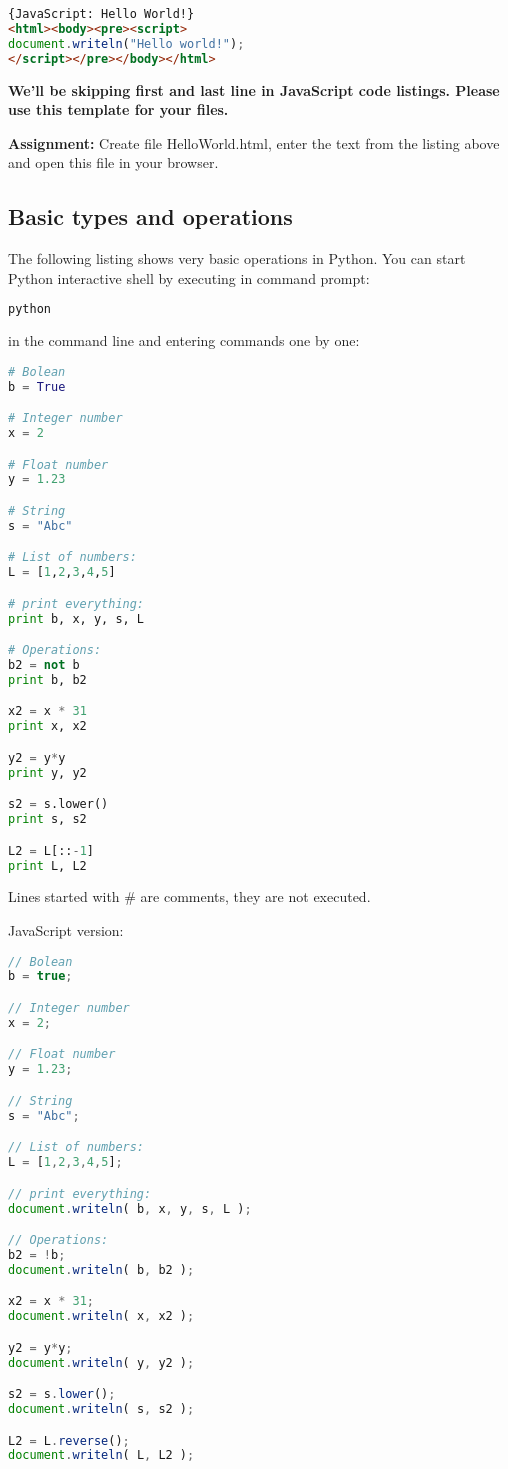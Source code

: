 \begin{lstlisting}[style=codelst,language=HTML]{JavaScript: Hello World!}
<html><body><pre><script>
document.writeln("Hello world!");
</script></pre></body></html>
\end{lstlisting}
\textbf{We'll be skipping first and last line in JavaScript
code listings. Please use this template for your files.}

\bigskip
\begin{tcolorbox}
\textbf{Assignment:} Create file HelloWorld.html, enter the text from the
listing above and open this file in your browser.
\end{tcolorbox}

\subsection{Basic types and operations}

The following listing shows very basic operations
in Python. You can start Python interactive shell by executing
in command prompt:
\begin{lstlisting}[language=bash,style=codelst]
python
\end{lstlisting}
in the command line and entering commands one by one:

\begin{lstlisting}[style=codelst,language=Python]
# Bolean
b = True

# Integer number
x = 2

# Float number
y = 1.23

# String
s = "Abc"

# List of numbers:
L = [1,2,3,4,5]

# print everything:
print b, x, y, s, L

# Operations:
b2 = not b
print b, b2

x2 = x * 31
print x, x2

y2 = y*y
print y, y2

s2 = s.lower()
print s, s2

L2 = L[::-1]
print L, L2
\end{lstlisting}
Lines started with \# are comments, they are not executed.

JavaScript version:
\begin{lstlisting}[style=codelst,language=JavaScript]
// Bolean
b = true;

// Integer number
x = 2;

// Float number
y = 1.23;

// String
s = "Abc";

// List of numbers:
L = [1,2,3,4,5];

// print everything:
document.writeln( b, x, y, s, L );

// Operations:
b2 = !b;
document.writeln( b, b2 );

x2 = x * 31;
document.writeln( x, x2 );

y2 = y*y;
document.writeln( y, y2 );

s2 = s.lower();
document.writeln( s, s2 );

L2 = L.reverse(); 
document.writeln( L, L2 );
\end{lstlisting}


